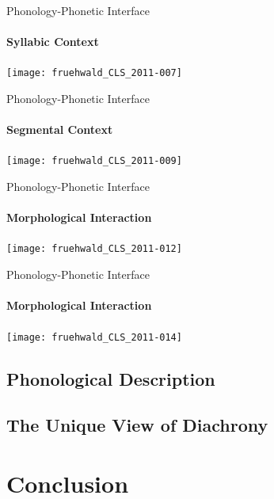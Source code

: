 \documentclass[]{beamer}
\begin{document}
\begin{frame}{Phonology-Phonetic Interface}
	\framesubtitle{Syllabic Context}

\texttt{[image: fruehwald\_CLS\_2011-007]}
	
\end{frame}


\begin{frame}{Phonology-Phonetic Interface}
	\framesubtitle{Segmental Context}

\texttt{[image: fruehwald\_CLS\_2011-009]}
		
\end{frame}




\begin{frame}{Phonology-Phonetic Interface}
	\framesubtitle{Morphological Interaction}

\texttt{[image: fruehwald\_CLS\_2011-012]}
		
\end{frame}




\begin{frame}{Phonology-Phonetic Interface}
	\framesubtitle{Morphological Interaction}

\texttt{[image: fruehwald\_CLS\_2011-014]}
		
\end{frame}



\subsection{Phonological Description}


\subsection{The Unique View of Diachrony}

\section{Conclusion}
\end{document}
